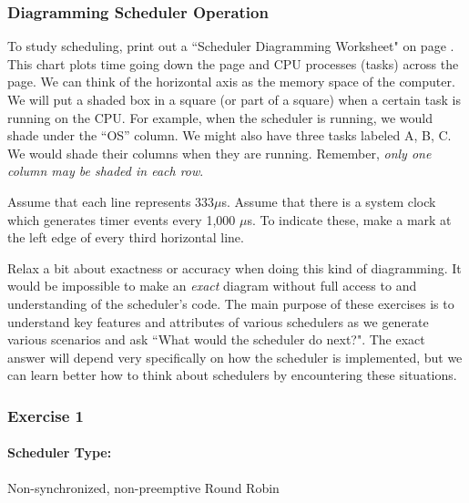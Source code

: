 \subsubsection*{Diagramming Scheduler Operation}
To study scheduling, print out a ``Scheduler Diagramming Worksheet"
 on page \pageref{SchedWorksheet}.	%
This chart plots time going down the page and CPU
processes (tasks) across the page. We can think of the horizontal axis
as the memory space of the computer. We will put a shaded box in a
square (or part of a square) when a certain task is running on the CPU.
For example, when the scheduler is running, we would shade under the
``OS'' column. We might also have three tasks labeled A, B, C. We would
shade their columns when they are running. Remember, {\em only one column
may be shaded in each row}.

Assume that each line represents 333$\mu$s.   Assume that there is
a system clock which generates timer events every 1,000 $\mu$s.
To indicate these, make a mark at the left edge of every third
horizontal line.

Relax a bit about exactness or accuracy when doing this kind of diagramming. 
It would be impossible to make an {\it exact} diagram without full access to 
and understanding of the scheduler's code.   The main purpose of these exercises
is to understand key features and attributes of various schedulers as we
generate various scenarios and ask ``What would the scheduler do next?".  
The exact answer will depend very specifically on how the scheduler is 
implemented,  but we
can learn better how to think about schedulers by encountering these situations. 

%
%
%
%
%
%
\subsubsection{Exercise 1}\label{SchEx1}

\paragraph{Scheduler Type:} Non-synchronized, non-preemptive Round Robin
